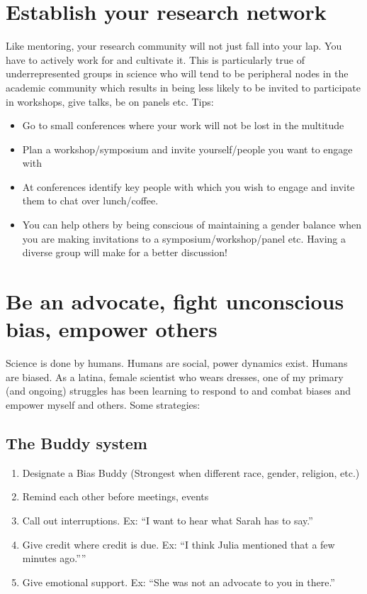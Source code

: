\documentclass[12pt]{article}
\begin{document}
\section{Establish your research network}
Like mentoring, your research community will not just fall into your
lap. You have to actively work for and cultivate it. This is
particularly true of underrepresented groups in science who will tend
to be peripheral nodes in the academic community which results in
being less likely to be invited to participate in workshops, give
talks, be on panels etc. Tips:

\begin{itemize}
\item Go to small conferences where your work will not be lost in the
  multitude
\item Plan a workshop/symposium and invite yourself/people you want to
  engage with
\item At conferences identify key people with which you wish to engage
  and invite them to chat over lunch/coffee.
\item You can help others by being conscious of maintaining a gender
  balance when you are making invitations to a
  symposium/workshop/panel etc. Having a diverse group will make for a
  better discussion!
\end{itemize}



\section{Be an advocate, fight unconscious bias, empower others}
\label{sec:advocate}
Science is done by humans. Humans are social, power dynamics
exist. Humans are biased. As a latina, female scientist who wears
dresses, one of my primary (and ongoing) struggles has been learning
to respond to and combat biases and empower myself and others. Some
strategies:
 
\subsection{The Buddy system}
\label{sec:buddy}
\begin{enumerate}
\item Designate a Bias Buddy (Strongest when different race, gender,
  religion, etc.)
\item Remind each other before meetings, events
\item Call out interruptions. Ex: ``I want to hear what Sarah has to
  say.''
\item Give credit where credit is due. Ex: ``I think Julia mentioned
  that a few minutes ago.”''
\item Give emotional support. Ex: ``She was not an advocate to you in
  there.''
\end{enumerate}
\end{document}
